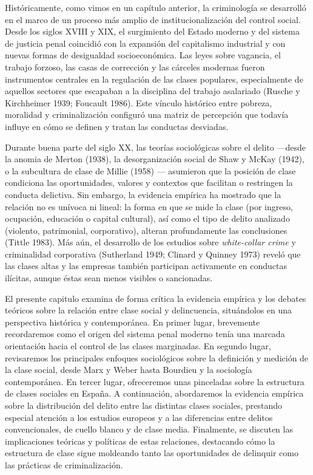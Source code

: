 \documentclass[
  spanish,
  letterpaper,
  DIV=11,
  numbers=noendperiod]{scrreprt}
\begin{document}
Históricamente, como vimos en un capítulo anterior, la criminología se
desarrolló en el marco de un proceso más amplio de institucionalización
del control social. Desde los siglos XVIII y XIX, el surgimiento del
Estado moderno y del sistema de justicia penal coincidió con la
expansión del capitalismo industrial y con nuevas formas de desigualdad
socioeconómica. Las leyes sobre vagancia, el trabajo forzoso, las casas
de corrección y las cárceles modernas fueron instrumentos centrales en
la regulación de las clases populares, especialmente de aquellos
sectores que escapaban a la disciplina del trabajo asalariado (Rusche y
Kirchheimer 1939; Foucault 1986). Este vínculo histórico entre pobreza,
moralidad y criminalización configuró una matriz de percepción que
todavía influye en cómo se definen y tratan las conductas desviadas.

Durante buena parte del siglo XX, las teorías sociológicas sobre el
delito ---desde la anomia de Merton (1938), la desorganización social de
Shaw y McKay (1942), o la subcultura de clase de Millie (1958) ---
asumieron que la posición de clase condiciona las oportunidades, valores
y contextos que facilitan o restringen la conducta delictiva. Sin
embargo, la evidencia empírica ha mostrado que la relación no es unívoca
ni lineal: la forma en que se mide la clase (por ingreso, ocupación,
educación o capital cultural), así como el tipo de delito analizado
(violento, patrimonial, corporativo), alteran profundamente las
conclusiones (Tittle 1983). Más aún, el desarrollo de los estudios sobre
\emph{white-collar crime} y criminalidad corporativa (Sutherland 1949;
Clinard y Quinney 1973) reveló que las clases altas y las empresas
también participan activamente en conductas ilícitas, aunque éstas sean
menos visibles o sancionadas.

El presente capitulo examina de forma crítica la evidencia empírica y
los debates teóricos sobre la relación entre clase social y
delincuencia, situándolos en una perspectiva histórica y contemporánea.
En primer lugar, brevemente recordaremos como el origen del sistema
penal moderno tenía una marcada orientación hacia el control de las
clases marginadas. En segundo lugar, revisaremos los principales
enfoques sociológicos sobre la definición y medición de la clase social,
desde Marx y Weber hasta Bourdieu y la sociología contemporánea. En
tercer lugar, ofreceremos unas pinceladas sobre la estructura de clases
sociales en España. A continuación, abordaremos la evidencia empírica
sobre la distribución del delito entre las distintas clases sociales,
prestando especial atención a los estudios europeos y a las diferencias
entre delitos convencionales, de cuello blanco y de clase media.
Finalmente, se discuten las implicaciones teóricas y políticas de estas
relaciones, destacando cómo la estructura de clase sigue moldeando tanto
las oportunidades de delinquir como las prácticas de criminalización.
\end{document}

